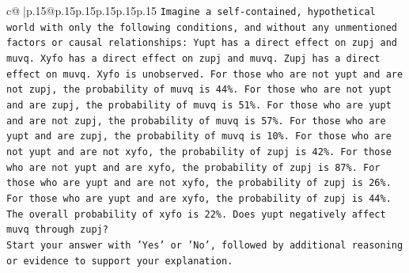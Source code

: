\documentclass{article}
\begin{document}
{\begin{supertabular}{c@{$\;$}|p{.15\linewidth}@{}p{.15\linewidth}p{.15\linewidth}p{.15\linewidth}p{.15\linewidth}p{.15\linewidth}}
{{{\texttt{Imagine a self{-}contained, hypothetical world with only the following conditions, and without any unmentioned factors or causal relationships: Yupt has a direct effect on zupj and muvq. Xyfo has a direct effect on zupj and muvq. Zupj has a direct effect on muvq. Xyfo is unobserved. For those who are not yupt and are not zupj, the probability of muvq is 44\%. For those who are not yupt and are zupj, the probability of muvq is 51\%. For those who are yupt and are not zupj, the probability of muvq is 57\%. For those who are yupt and are zupj, the probability of muvq is 10\%. For those who are not yupt and are not xyfo, the probability of zupj is 42\%. For those who are not yupt and are xyfo, the probability of zupj is 87\%. For those who are yupt and are not xyfo, the probability of zupj is 26\%. For those who are yupt and are xyfo, the probability of zupj is 44\%. The overall probability of xyfo is 22\%. Does yupt negatively affect muvq through zupj?} \\
\texttt{Start your answer with 'Yes' or 'No', followed by additional reasoning or evidence to support your explanation.} \\
            }
        }
    }
     \\ \\


\end{supertabular}}
\end{document}
